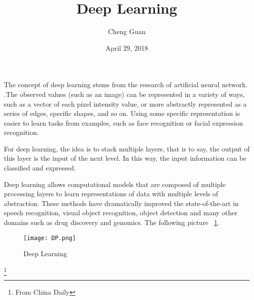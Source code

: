 \documentclass[12pt]{article}
\begin{document}
\title{Deep Learning}
\author{Cheng Guan}
\date{April 29, 2018}
\maketitle
\setlength{\baselineskip}{20pt}

    The concept of deep learning stems from the research of artificial neural network.
    .The observed values (such as an image) can be represented in a variety of ways,
    such as a vector of each pixel intensity value, or more abstractly represented as a series of edges, specific shapes, and so on. Using some specific representation is easier to learn tasks from examples, such as face recognition or facial expression recognition.

  For deep learning, the idea is to stack multiple layers, that is to say, the output of this layer is the input of the next level. In this way,
  the input information can be classified and expressed.

   Deep learning allows computational models that are composed of multiple processing layers to learn representations of data with multiple levels of abstraction.
  These methods have dramatically improved the state-of-the-art in speech recognition, visual object recognition,
  object detection and many other domains such as drug discovery and genomics.\cite{test2}
  The following picture ~\ref{fig1}.

 \begin{figure}[ht]
 \centering
 \texttt{[image: DP.png]}
 \caption{Deep Learning}
 \label{fig1}
\end{figure}




  \footnote{\centering From China Daily}
\end{document}
